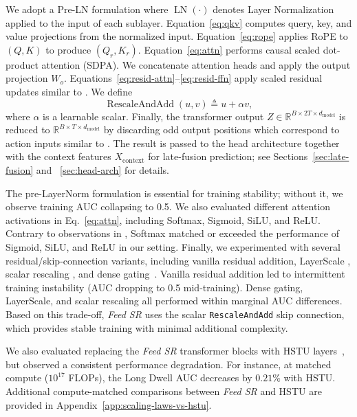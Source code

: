 \documentclass[sigconf]{acmart}
\newcommand{\systemname}{\textit{Feed SR}}
\begin{document}
We adopt a Pre-LN formulation where $\operatorname{LN}(\cdot)$ denotes Layer Normalization \cite{ba2016layer} applied to the input of each sublayer. Equation~\eqref{eq:qkv} computes query, key, and value projections from the normalized input. Equation~\eqref{eq:rope} applies RoPE to $(Q,K)$ to produce $(Q_r,K_r)$. Equation~\eqref{eq:attn} performs causal scaled dot-product attention (SDPA). We concatenate attention heads and apply the output projection $W_o$. Equations~\eqref{eq:resid-attn}--\eqref{eq:resid-ffn} apply scaled residual updates similar to \cite{bachlechner2021rezero}. We define
\begin{equation}
\operatorname{RescaleAndAdd}(u,v) \triangleq u + \alpha v,
\end{equation}
where $\alpha$ is a learnable scalar. Finally, the transformer output $Z \in \mathbb{R}^{B \times 2T \times d_{\text{model}}}$ is reduced to $\mathbb{R}^{B \times T \times d_{\text{model}}}$ by discarding odd output positions which correspond to action inputs similar to \cite{zhai2024actions}. The result is passed to the head architecture together with the context features $X_{\text{context}}$ for late-fusion prediction; see Sections~\ref{sec:late-fusion} and ~\ref{sec:head-arch} for details.

The pre-LayerNorm formulation is essential for training stability; without it, we observe training AUC collapsing to 0.5. We also evaluated different attention activations in Eq.~\eqref{eq:attn}, including Softmax, Sigmoid, SiLU, and ReLU. Contrary to observations in \cite{zhai2024actions}, Softmax matched or exceeded the performance of Sigmoid, SiLU, and ReLU in our setting. Finally, we experimented with several residual/skip-connection variants, including vanilla residual addition, LayerScale \cite{touvron2021going}, scalar rescaling \cite{bachlechner2021rezero}, and dense gating~\cite{chai2020highway}. Vanilla residual addition led to intermittent training instability (AUC dropping to 0.5 mid-training). Dense gating, LayerScale, and scalar rescaling all performed within marginal AUC differences. Based on this trade-off, {\systemname} uses the scalar \texttt{RescaleAndAdd} skip connection, which provides stable training with minimal additional complexity.

We also evaluated replacing the {\systemname} transformer blocks with HSTU layers~\cite{zhai2024actions}, but observed a consistent performance degradation. For instance, at matched compute ($10^{17}$ FLOPs), the Long Dwell AUC decreases by $0.21\%$ with HSTU. Additional compute-matched comparisons between {\systemname} and HSTU are provided in Appendix~\ref{app:scaling-laws-vs-hstu}.
\end{document}

